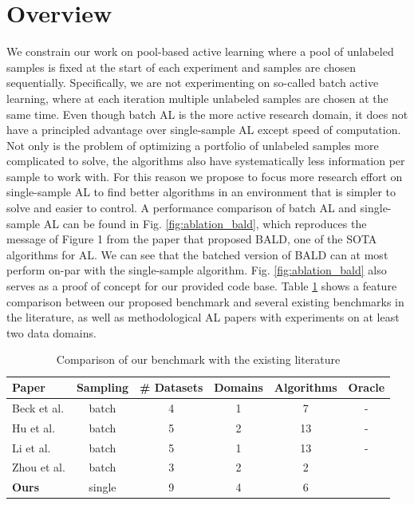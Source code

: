 \documentclass[]{article}
\begin{document}
\section{Overview}
We constrain our work on pool-based active learning where a pool of unlabeled samples is fixed at the start of each experiment and samples are chosen sequentially.
Specifically, we are not experimenting on so-called batch active learning, where at each iteration multiple unlabeled samples are chosen at the same time.
Even though batch AL is the more active research domain, it does not have a principled advantage over single-sample AL except speed of computation.
Not only is the problem of optimizing a portfolio of unlabeled samples more complicated to solve, the algorithms also have systematically less information per sample to work with.
For this reason we propose to focus more research effort on single-sample AL to find better algorithms in an environment that is simpler to solve and easier to control.
A performance comparison of batch AL and single-sample AL can be found in Fig. \ref{fig:ablation_bald}, which reproduces the message of Figure 1 from the paper \cite{gal2017deep} that proposed BALD, one of the SOTA algorithms for AL.
We can see that the batched version of BALD \cite{krizhevsky2009learning} can at most perform on-par with the single-sample algorithm.
Fig. \ref{fig:ablation_bald} also serves as a proof of concept for our provided code base.
Table \ref{tab:benchmark_comparison} shows a feature comparison between our proposed benchmark and several existing benchmarks in the literature, as well as methodological AL papers with experiments on at least two data domains.
\begin{table}[h]
	\centering
	\begin{tabular}{l | c c c c c}
		Paper & Sampling & \# Datasets & Domains & Algorithms & Oracle \\
		\hline
		Beck et al. \cite{beck2021effective} & batch & 4 & 1 & 7 & - \\
		Hu et al. \cite{hu2021towards} & batch & 5 & 2 & 13 & - \\
		Li et al. \cite{li2022empirical} & batch & 5 & 1 & 13 & - \\
		Zhou et al. \cite{zhou2021towards} & batch & 3 & 2 & 2 & \checkmark \\
		\textbf{Ours} & single & 9 & 4 & 6 & \checkmark 
	\end{tabular}
	\caption{Comparison of our benchmark with the existing literature}
	\label{tab:benchmark_comparison}
\end{table}
\end{document}
